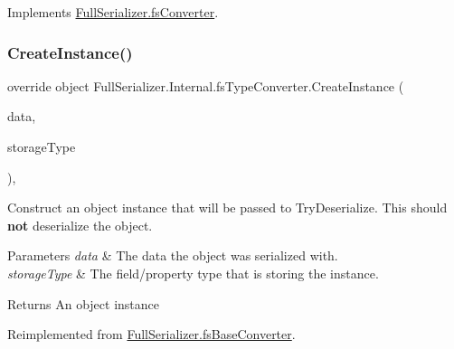 Implements \hyperlink{class_full_serializer_1_1fs_converter_a6d9e084c5e7f646a8d220705efaecb35}{Full\+Serializer.\+fs\+Converter}.

\mbox{\label{class_full_serializer_1_1_internal_1_1fs_type_converter_af2049f4529f9138347b63bee54aa7397}} 
\subsubsection{\texorpdfstring{Create\+Instance()}{CreateInstance()}}
{\footnotesize\ttfamily override object Full\+Serializer.\+Internal.\+fs\+Type\+Converter.\+Create\+Instance (\begin{DoxyParamCaption}\item[{\hyperlink{class_full_serializer_1_1fs_data}{fs\+Data}}]{data,  }\item[{Type}]{storage\+Type }\end{DoxyParamCaption})\hspace{0.3cm}{\ttfamily [inline]}, {\ttfamily [virtual]}}



Construct an object instance that will be passed to Try\+Deserialize. This should {\bfseries not} deserialize the object. 


\begin{DoxyParams}{Parameters}
{\em data} & The data the object was serialized with.\\
\hline
{\em storage\+Type} & The field/property type that is storing the instance.\\
\hline
\end{DoxyParams}
\begin{DoxyReturn}{Returns}
An object instance
\end{DoxyReturn}


Reimplemented from \hyperlink{class_full_serializer_1_1fs_base_converter_a415ea2ac9429bbb9927346af7cb7c2e1}{Full\+Serializer.\+fs\+Base\+Converter}.

\mbox{\label{class_full_serializer_1_1_internal_1_1fs_type_converter_a60f6421c5356bcf6954d3c888bbaf860}} 
